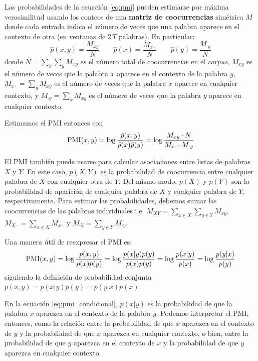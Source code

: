 Las probabilidades de la ecuación \ref{eq:pmi} pueden estimarse por máxima verosimilitud usando los conteos de una \textbf{matriz de coocurrencias} simétrica $M$ donde cada entrada indica el número de veces que una palabra aparece en el contexto de otra (en ventanas de $2\,T$ palabras). En particular:
%
\begin{equation} \label{eq:pmi_probas}
    \hat{p}(x,y) = \frac{M_{xy}}{N} \qquad
    \hat{p}(x) = \frac{M_{x\cdot}}{N} \qquad
    \hat{p}(y) = \frac{M_{\cdot y}}{N}
\end{equation}
%
donde $N = \sum_{x} \sum_{y} M_{xy}$ es el número total de coocurrencias en el \emph{corpus}, $M_{xy}$ es el número de veces que la palabra $x$ aparece en el contexto de la palabra $y$, $M_{x\cdot} = \sum_y M_{xy}$ es el número de veces que la palabra $x$ aparece en cualquier contexto, y $M_{\cdot y} = \sum_x M_{xy}$ es el número de veces que la palabra $y$ aparece en cualquier contexto. 

Estimamos el PMI entonces con
%
\begin{equation} \label{eq:pmi_estimado}
    \operatorname{PMI}(x,y)
        = \log \frac{\hat{p}(x,y)}{\hat{p}(x)\hat{p}(y)}
        = \log \frac{M_{xy} \cdot N}{M_{x\cdot} \cdot M_{\cdot y}}
\end{equation}

El PMI también puede usarse para calcular asociaciones entre listas de palabras $X$ y $Y$. En este caso, $p(X,Y)$ es la probabilidad de coocurrencia entre cualquier palabra de $X$ con cualquier otra de $Y$. Del mismo modo, $p(X)$ y $p(Y)$ son la probabilidad de aparición de cualquier palabra de $X$ y cualquier palabra de $Y$, respectivamente. Para estimar las probabilidades, debemos sumar las coocurrencias de las palabras individuales i.e. $M_{XY} = \sum_{x \in X} \sum_{y \in Y} M_{xy}$, $M_{X\cdot} = \sum_{x \in X} M_{x\cdot}$ y $M_{\cdot Y} = \sum_{y \in Y} M_{\cdot y}$.

Una manera útil de reexpresar el PMI es:
%
\begin{equation} \label{eq:pmi_condicional}
    \operatorname{PMI}(x,y)
        = \log \frac{p(x,y)}{p(x)p(y)}
        = \log \frac{p(x|y)p(y)}{p(x)p(y)}
        = \log \frac{p(x|y)}{p(x)}
        = \log \frac{p(y|x)}{p(y)}
\end{equation}
%
siguiendo la definición de probabilidad conjunta $p(x,y) = p(x|y)p(y) = p(y|x)p(x)$. 

En la ecuación \ref{eq:pmi_condicional}, $p(x|y)$ es la probabilidad de que la palabra $x$ aparezca en el contexto de la palabra $y$. Podemos interpretar el PMI, entonces, como la relación entre la probabilidad de que $x$ aparezca en el contexto de $y$ y la probabilidad de que $x$ aparezca en cualquier contexto, o bien, entre la probabilidad de que $y$ aparezca en el contexto de $x$ y la probabilidad de que $y$ aparezca en cualquier contexto.

